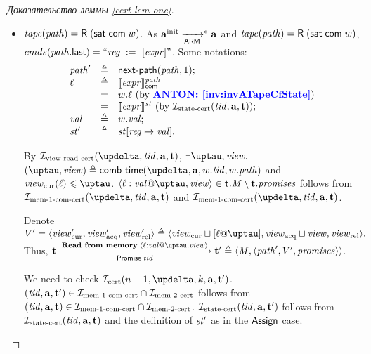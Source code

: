 \begin{proof}[Доказательство леммы \ref{cert-lem-one}]
\begin{itemize}
    \item $\mathit{tape}(\mathit{path}) = \textsf{R} \; (\mathsf{sat} \; \mathsf{com} \; w)$.
      As $\mathbf{a}^{\rm init} \xrightarrow[\mathsf{ARM}]{}^{*} \mathbf{a}$ and $\mathit{tape}(\mathit{path}) = \textsf{R} \; (\mathsf{sat} \; \mathsf{com} \; w)$,
      ${cmds}(\mathit{path}.\textup{\sf last}) = ``\mathit{reg} \;:=_{}\;[\mathit{expr}]"$.
      Some notations:
      \[\begin{array}{l l l}
        \mathit{path}'    & \triangleq & \mathsf{next}\textsf{-}\mathsf{path}(\mathit{path}, 1); \\
        \ell       & \triangleq & \llbracket\mathit{expr}\rrbracket ^{\mathit{path}}_\mathsf{com} \\
                   & =          & w.\ell \text{ (by {\color{blue}\textbf{ANTON: \ref{inv:invATapeCfState}}})} \\
                   & =          & \llbracket\mathit{expr}\rrbracket ^{\mathit{st}} \text{ (by $\mathcal{I}_{\textup{\rm state-cert}}(\mathit{tid}, \mathbf{a}, \mathbf{t})$)}; \\
        \mathit{val}  & \triangleq & w.\mathit{val}; \\
        \mathit{st}' & \triangleq & \mathit{st}[\mathit{reg} \mapsto \mathit{val}]. \\
      \end{array}\]
      
      By $\invViewReadCERT(\delta, \tId, \aT, \tT)$, $\exists \tau, \R.$
      $(\tau, \R) \triangleq \deltaHmap(\delta, \aT, \w.\tId, \w.\cpath)$ and \\
      $\Rcur(\loc) \le \tau$.
      $\writeEvt{\loc}{\stval}{\tau}{\R} \in \tT.\Mprom \setminus \tT.\PromSet$
      follows from $\invMemOneCERT(\delta, \tId, \aT, \tT)$ and $\invMemOneCERT(\delta, \tId, \aT, \tT)$.
      
      Denote $\V' = \angled{\Rcur', \Racq', \Rrel'} \triangleq \angled{\Rcur \sqcup [\loc@\tau], \Racq \sqcup \R, \Rrel}.$\\
      Thus, $\tT \promTStepReadLoc \tT' \triangleq \angled{\Mprom, \angled{\cpath', \V', \PromSet}}$.
      
      We need to check $\invCert(n - 1, \delta, k, \aT, \tT')$.
      $(\mathit{tid}, \mathbf{a}, \mathbf{t}') \in \mathcal{I}_{\textup{\rm mem-1-com-cert}} \cap \mathcal{I}_{\textup{\rm mem-2-cert}}$ follows from 
      $(\mathit{tid}, \mathbf{a}, \mathbf{t}) \in \mathcal{I}_{\textup{\rm mem-1-com-cert}} \cap \mathcal{I}_{\textup{\rm mem-2-cert}}$.
      $\mathcal{I}_{\textup{\rm state-cert}}(\mathit{tid}, \mathbf{a}, \mathbf{t}')$ follows from $\mathcal{I}_{\textup{\rm state-cert}}(\mathit{tid}, \mathbf{a}, \mathbf{t})$ and the definition of $\mathit{st}'$
      as in the $\textsf{Assign}$ case.
      

\end{itemize}
\end{proof}
